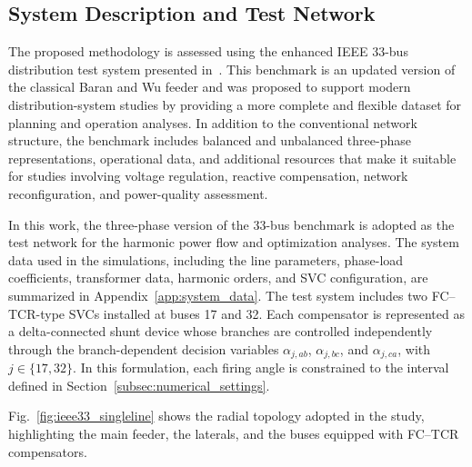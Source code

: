 \documentclass[journal]{IEEEtran}
\begin{document}
\subsection{System Description and Test Network}
\label{subsec:system}

The proposed methodology is assessed using the enhanced IEEE 33-bus
distribution test system presented in~\cite{dolatabadi2021}. This benchmark
is an updated version of the classical Baran and Wu feeder and was proposed
to support modern distribution-system studies by providing a more complete
and flexible dataset for planning and operation analyses. In addition to the
conventional network structure, the benchmark includes balanced and
unbalanced three-phase representations, operational data, and additional
resources that make it suitable for studies involving voltage regulation,
reactive compensation, network reconfiguration, and power-quality
assessment.

In this work, the three-phase version of the 33-bus benchmark is adopted as
the test network for the harmonic power flow and optimization analyses. The
system data used in the simulations, including the line parameters, phase-load
coefficients, transformer data, harmonic orders, and SVC configuration, are
summarized in Appendix~\ref{app:system_data}. The test system includes two
FC--TCR-type SVCs installed at buses 17 and 32. Each compensator is represented
as a delta-connected shunt device whose branches are controlled independently
through the branch-dependent decision variables
$\alpha_{j,ab}$, $\alpha_{j,bc}$, and $\alpha_{j,ca}$, with
$j \in \{17,32\}$. In this formulation, each firing angle is constrained to
the interval defined in Section~\ref{subsec:numerical_settings}.

Fig.~\ref{fig:ieee33_singleline} shows the radial topology adopted in the
study, highlighting the main feeder, the laterals, and the buses equipped
with FC--TCR compensators.
\end{document}
